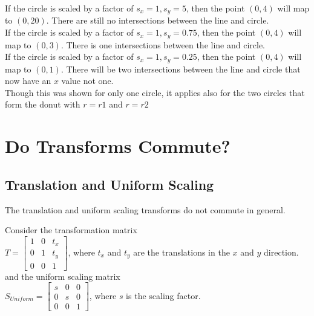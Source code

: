 \documentclass[a4paper,10pt]{scrartcl}
\begin{document}
If the circle is scaled by a factor of $s_x = 1, s_y = 5$, then the point $(0,4)$ will map to $(0, 20)$. There are still no intersections between the line and circle.\\

If the circle is scaled by a factor of $s_x = 1, s_y = 0.75$, then the point $(0,4)$ will map to $(0, 3)$. There is one intersections between the line and circle.\\

If the circle is scaled by a factor of $s_x = 1, s_y = 0.25$, then the point $(0,4)$ will map to $(0, 1)$. There will be two intersections between the line and circle that now have an $x$ value not one.\\

Though this was shown for only one circle, it applies also for the two circles that form the donut with $r = r1$ and $r = r2$



\section{Do Transforms Commute?}

\subsection{Translation and Uniform Scaling}

The translation and uniform scaling transforms do not commute in general.

Consider the transformation matrix \\

$T = 
\begin{bmatrix}
    1       & 0 & t_x \\
    0       & 1 & t_y \\
    0       & 0 & 1 
\end{bmatrix}
$, where $t_x $ and $t_y$ are the translations in the $x$ and $y$ direction. \\

and the uniform scaling matrix \\

$S_{Uniform} = \begin{bmatrix}
    s       & 0 & 0 \\
    0       & s & 0 \\
    0       & 0 & 1     
 \end{bmatrix}
$, where $s$ is the scaling factor. \\
\end{document}
